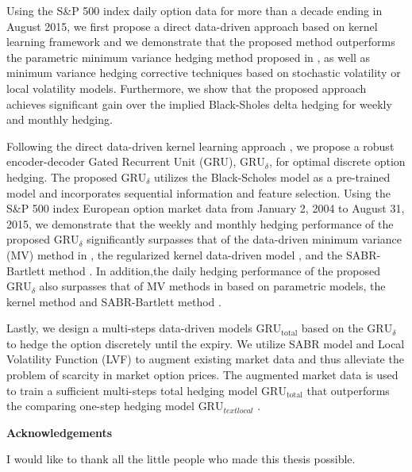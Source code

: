 Using the S\&P 500 index daily option data for more than a decade ending in August 2015, we first propose a direct data-driven approach \citep{knian2017} based on kernel learning framework and we demonstrate  that the proposed method outperforms the parametric minimum variance hedging method proposed in \citep{hulloptimal}, as well as  minimum variance hedging corrective techniques based on stochastic volatility or local volatility models.
Furthermore, we show that the proposed approach achieves significant gain over the implied Black-Sholes delta hedging for weekly and monthly hedging.

Following the direct data-driven kernel learning approach \citep{knian2017}, we propose a robust encoder-decoder  Gated Recurrent Unit (GRU), $\text{GRU}_{\delta}$, for optimal discrete option hedging. The proposed $\text{GRU}_{\delta}$ utilizes the Black-Scholes model as a pre-trained model and  incorporates sequential information and feature selection.  Using the S\&P 500 index European option market data from January 2, 2004 to August 31, 2015,   we demonstrate that the weekly and monthly hedging performance of the proposed $\text{GRU}_{\delta}$ significantly surpasses that of the data-driven minimum variance (MV) method in \citep{hulloptimal}, the regularized kernel data-driven model \citep{knian2017}, and the SABR-Bartlett method \cite{hagan2017bartlett}.
In addition,the daily hedging performance of the proposed $\text{GRU}_{\delta}$ also surpasses that of MV methods in \cite{hulloptimal} based on parametric models, the kernel method \citep{knian2017} and SABR-Bartlett method \cite{hagan2017bartlett}.

Lastly, we design a multi-steps data-driven models $\text{GRU}_{\text{total}}$ based on the $\text{GRU}_{\delta}$  to hedge the option discretely until the expiry.  We utilize SABR model and Local Volatility Function (LVF) to augment existing market data and thus alleviate the problem of  scarcity in market option prices. The augmented market data is used to train a sufficient multi-steps total hedging model $\text{GRU}_{\text{total}}$ that outperforms the comparing one-step hedging model $\text{GRU}_{text{local}}$ .
\cleardoublepage


\begin{center}\textbf{Acknowledgements}\end{center}

I would like to thank all the little people who made this thesis possible.
\cleardoublepage

